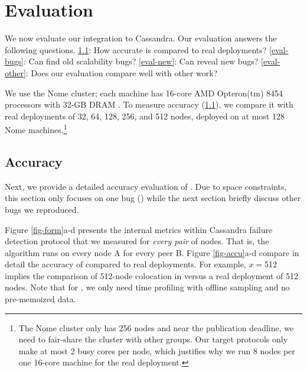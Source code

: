 
\section{Evaluation}
\label{sec-eval}


We now evaluate our \sck integration to Cassandra. Our evaluation answers the
following questions.
%
\sec\ref{eval-accu}: How accurate is \sck compared to real deployments?
%
\sec\ref{eval-bugs}: Can \sck find old scalability bugs?
%
\sec\ref{eval-new}: Can \sck reveal new bugs?
%
%
\sec\ref{eval-other}: Does our evaluation compare well with other work?


We use the Nome cluster; each machine has 16-core AMD Opteron(tm) 8454
processors with 32-GB DRAM \cite{NomeNodes}.
%
To measure \sck accuracy (\sec\ref{eval-accu}), we compare it with real
deployments of 32, 64, 128, 256, and 512 nodes, deployed on at most 128 Nome
machines.\footnote{The Nome cluster only has 256 nodes and near the publication
deadline, we need to fair-share the cluster with other groups.  Our target
protocols only make at most 2 busy cores per node, which justifies why we run 8
nodes per one 16-core machine for the real deployment.}
%

\subsection{Accuracy}
\label{eval-accu}

\def \fff        {$f$}
\def \flaps      {\textit{\#flaps}\xspace}
\def \gosLast    {$T_{lastGossip}$\xspace}
\def \gosAvg     {$T_{avgGossip}$\xspace}
\def \gosProc    {$T_{gossipExec}$\xspace}
\def \supProc    {$T_{stateUpdate}$\xspace}
\def \hops       {\textit{\#hops}\xspace}

\def \ringTable  {$Size_{ringTable}$\xspace}
\def \newStates  {$Size_{newStates}$\xspace}
\def \cpuSpeed   {$CPU$\xspace}


Next, we provide a detailed accuracy evaluation of \sck.  Due to space
constraints, this section only focuses on one bug (\caone \cite{CA-One}) 
while the next
section briefly discuss other bugs we reproduced.




Figure \ref{fig-form}a-d presents the  internal metrics within
Cassandra failure detection protocol that we measured for {\em every pair}
of nodes.  That is, the algorithm runs on every node A for every peer B.
%
Figure \ref{fig-accu}a-d compare in detail the accuracy of \sck compared
to real deployments.
%
For example, $x$$=$512 implies the comparison of 512-node colocation in
\sck versus a real deployment of 512 nodes.
%
Note that for \caone, we only need time profiling with offline sampling
and no pre-memoized data.  
%


